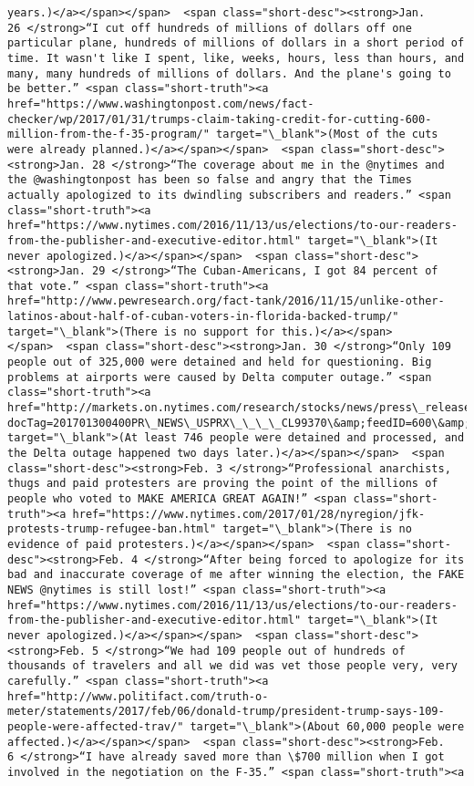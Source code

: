\documentclass[11pt]{article}
\begin{document}
\begin{Verbatim}[commandchars=\\\{\}]
years.)</a></span></span>  <span class="short-desc"><strong>Jan. 26 </strong>“I cut off hundreds of millions of dollars off one particular plane, hundreds of millions of dollars in a short period of time. It wasn't like I spent, like, weeks, hours, less than hours, and many, many hundreds of millions of dollars. And the plane's going to be better.” <span class="short-truth"><a href="https://www.washingtonpost.com/news/fact-checker/wp/2017/01/31/trumps-claim-taking-credit-for-cutting-600-million-from-the-f-35-program/" target="\_blank">(Most of the cuts were already planned.)</a></span></span>  <span class="short-desc"><strong>Jan. 28 </strong>“The coverage about me in the @nytimes and the @washingtonpost has been so false and angry that the Times actually apologized to its dwindling subscribers and readers.” <span class="short-truth"><a href="https://www.nytimes.com/2016/11/13/us/elections/to-our-readers-from-the-publisher-and-executive-editor.html" target="\_blank">(It never apologized.)</a></span></span>  <span class="short-desc"><strong>Jan. 29 </strong>“The Cuban-Americans, I got 84 percent of that vote.” <span class="short-truth"><a href="http://www.pewresearch.org/fact-tank/2016/11/15/unlike-other-latinos-about-half-of-cuban-voters-in-florida-backed-trump/" target="\_blank">(There is no support for this.)</a></span></span>  <span class="short-desc"><strong>Jan. 30 </strong>“Only 109 people out of 325,000 were detained and held for questioning. Big problems at airports were caused by Delta computer outage.” <span class="short-truth"><a href="http://markets.on.nytimes.com/research/stocks/news/press\_release.asp?docTag=201701300400PR\_NEWS\_USPRX\_\_\_\_CL99370\&amp;feedID=600\&amp;press\_symbol=7311173" target="\_blank">(At least 746 people were detained and processed, and the Delta outage happened two days later.)</a></span></span>  <span class="short-desc"><strong>Feb. 3 </strong>“Professional anarchists, thugs and paid protesters are proving the point of the millions of people who voted to MAKE AMERICA GREAT AGAIN!” <span class="short-truth"><a href="https://www.nytimes.com/2017/01/28/nyregion/jfk-protests-trump-refugee-ban.html" target="\_blank">(There is no evidence of paid protesters.)</a></span></span>  <span class="short-desc"><strong>Feb. 4 </strong>“After being forced to apologize for its bad and inaccurate coverage of me after winning the election, the FAKE NEWS @nytimes is still lost!” <span class="short-truth"><a href="https://www.nytimes.com/2016/11/13/us/elections/to-our-readers-from-the-publisher-and-executive-editor.html" target="\_blank">(It never apologized.)</a></span></span>  <span class="short-desc"><strong>Feb. 5 </strong>“We had 109 people out of hundreds of thousands of travelers and all we did was vet those people very, very carefully.” <span class="short-truth"><a href="http://www.politifact.com/truth-o-meter/statements/2017/feb/06/donald-trump/president-trump-says-109-people-were-affected-trav/" target="\_blank">(About 60,000 people were affected.)</a></span></span>  <span class="short-desc"><strong>Feb. 6 </strong>“I have already saved more than \$700 million when I got involved in the negotiation on the F-35.” <span class="short-truth"><a 
\end{Verbatim}
\end{document}
